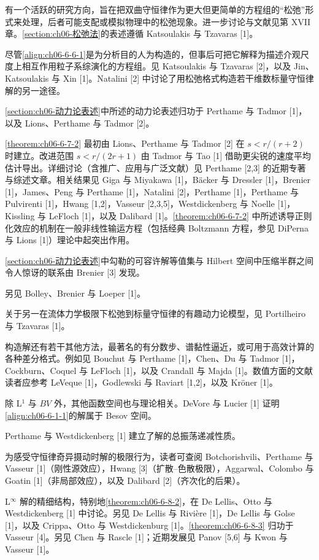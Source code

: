 \documentclass[../../main.tex]{subfiles}
\begin{document}
有一个活跃的研究方向，旨在把双曲守恒律作为更大但更简单的方程组的“松弛”形式来处理，后者可能支配或模拟物理中的松弛现象。进一步讨论与文献见第 XVII 章。\cref{section:ch06-松弛法}的表述遵循 Katsoulakis 与 Tzavaras [1]。

尽管\eqref{align:ch06-6-6-1}是为分析目的人为构造的，但事后可把它解释为描述介观尺度上相互作用粒子系综演化的方程组。见 Katsoulakis 与 Tzavaras [2]，以及 Jin、Katsoulakis 与 Xin [1]。Natalini [2] 中讨论了用松弛格式构造若干维数标量守恒律解的另一途径。

\cref{section:ch06-动力论表述}中所述的动力论表述归功于 Perthame 与 Tadmor [1]，以及 Lions、Perthame 与 Tadmor [2]。

\cref{theorem:ch06-6-7-2} 最初由 Lions、Perthame 与 Tadmor [2] 在 $s<r/(r+2)$ 时建立。改进范围 $s<r/(2r+1)$ 由 Tadmor 与 Tao [1] 借助更尖锐的速度平均估计导出。详细讨论（含推广、应用与广泛文献）见 Perthame [2,3] 的近期专著与综述文章。相关结果见 Giga 与 Miyakawa [1]，Bäcker 与 Dressler [1]，Brenier [1]，James、Peng 与 Perthame [1]，Natalini [2]，Perthame [1]，Perthame 与 Pulvirenti [1]，Hwang [1,2]，Vasseur [2,3,5]，Westdickenberg 与 Noelle [1]，Kissling 与 LeFloch [1]，以及 Dalibard [1]。\cref{theorem:ch06-6-7-2} 中所述诱导正则化效应的机制在一般非线性输运方程（包括经典 Boltzmann 方程，参见 DiPerna 与 Lions [1]）理论中起突出作用。

\cref{section:ch06-动力论表述}中勾勒的可容许解等值集与 Hilbert 空间中压缩半群之间令人惊讶的联系由 Brenier [3] 发现。

另见 Bolley、Brenier 与 Loeper [1]。

关于另一在流体力学极限下松弛到标量守恒律的有趣动力论模型，见 Portilheiro 与 Tzavaras [1]。

构造解还有若干其他方法，最著名的有分数步、谱黏性逼近，或可用于高效计算的各种差分格式。例如见 Bouchut 与 Perthame [1]，Chen、Du 与 Tadmor [1]，Cockburn、Coquel 与 LeFloch [1]，以及 Crandall 与 Majda [1]。数值方面的文献读者应参考 LeVeque [1]，Godlewski 与 Raviart [1,2]，以及 Kröner [1]。

除 L$^{1}$ 与 $BV$ 外，其他函数空间也与理论相关。DeVore 与 Lucier [1] 证明\eqref{align:ch06-6-1-1}的解属于 Besov 空间。

Perthame 与 Westdickenberg [1] 建立了解的总振荡递减性质。

为感受守恒律奇异摄动时解的极限行为，读者可查阅 Botchorishvili、Perthame 与 Vasseur [1]（刚性源效应），Hwang [3]（扩散--色散极限），Aggarwal、Colombo 与 Goatin [1]（非局部效应），以及 Dalibard [2]（齐次化的后果）。

L$^{\infty}$ 解的精细结构，特别地\cref{theorem:ch06-6-8-2}，在 De Lellis、Otto 与 Westdickenberg [1] 中讨论。另见 De Lellis 与 Rivière [1]，De Lellis 与 Golse [1]，以及 Crippa、Otto 与 Westdickenburg [1]。\cref{theorem:ch06-6-8-3} 归功于 Vasseur [4]。另见 Chen 与 Rascle [1]；近期发展见 Panov [5,6] 与 Kwon 与 Vasseur [1]。
\end{document}
